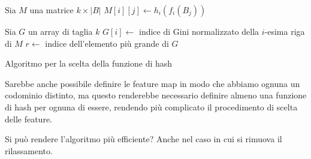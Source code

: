 \documentclass[a4paper]{article}
\begin{document}
\begin{algorithm}[H]
	\DontPrintSemicolon


	Sia $M$ una matrice $k \times |B|$ \;
	 {
		 {
			$M[i][j] \gets h_i(f_i(B_j))$ \;
		}
	}

	Sia $G$ un array di taglia $k$ \;
	 {
		$G[i] \gets$ indice di Gini normalizzato della $i$-esima riga di $M$ \;
	}
	$r \gets$ indice dell'elemento più grande di $G$ \;


	\caption{Algoritmo per la scelta della funzione di hash}
\end{algorithm}
Sarebbe anche possibile definire le feature map in modo che abbiamo ognuna un codominio distinto, ma questo renderebbe necessario definire almeno una funzione di hash per ognuna di essere, rendendo più complicato il procedimento di scelta delle feature.

Si può rendere l'algoritmo più efficiente? Anche nel caso in cui si rimuova il rilassamento.
\end{document}
